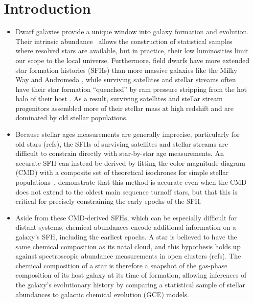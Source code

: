\documentclass[ms.tex]{subfiles}
\begin{document}
\section{Introduction}
\label{sec:intro}

\begin{itemize}

	\item Dwarf galaxies provide a unique window into galaxy formation and
	evolution.
	Their intrinsic abundance~\citep{Bell2003, Baldry2012} allows the
	construction of statistical samples where resolved stars are available, but
	in practice, their low luminosities limit our scope to the local universe.
	Furthermore, field dwarfs have more extended star formation histories (SFHs)
	than more massive galaxies like the Milky Way and Andromeda
	\citep[e.g.][]{Behroozi2019}, while surviving satellites and stellar
	streams often have their star formation ``quenched'' by ram pressure
	stripping from the hot halo of their host
	\citep*[see discussion in, e.g.,][]{Steyrleithner2020}.
	As a result, surviving satellites and stellar stream progenitors assembled
	more of their stellar mass at high redshift and are dominated by old
	stellar populations.

	\item Because stellar ages measurements are generally imprecise,
	particularly for old stars (refs), the SFHs of surviving satellites and
	stellar streams are difficult to constrain directly with star-by-star age
	measurements.
	An accurate SFH can instead be derived by fitting the color-magnitude
	diagram (CMD) with a composite set of theoretical isochrones for simple
	stellar populations~\citep[e.g.][]{Dolphin2002}.
	\citet{Weisz2014} demonstrate that this method is accurate even when the
	CMD does not extend to the oldest main sequence turnoff stars, but that
	this is critical for precisely constraining the early epochs of the SFH.

	\item Aside from these CMD-derived SFHs, which can be especially difficult
	for distant systems, chemical abundances encode additional information on a
	galaxy's SFH, including the earliest epochs.
	A star is believed to have the same chemical composition as its natal
	cloud, and this hypothesis holds up against spectroscopic abundance
	measurements in open clusters (refs).
	The chemical composition of a star is therefore a snapshot of the
	gas-phase composition of its host galaxy at its time of formation, allowing
	inferences of the galaxy's evolutionary history by comparing a statistical
	sample of stellar abundances to galactic chemical evolution (GCE) models.


\end{itemize}
\end{document}
